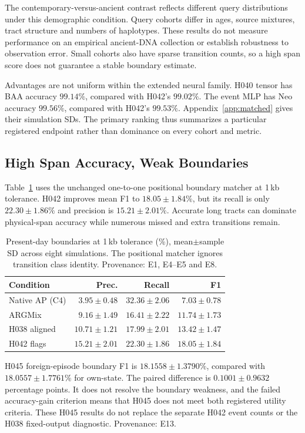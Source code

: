 \documentclass[letterpaper]{article}
\begin{document}
The contemporary-versus-ancient contrast reflects different query distributions under this demographic condition. Query cohorts differ in ages, source mixtures, tract structure and numbers of haplotypes. These results do not measure performance on an empirical ancient-DNA collection or establish robustness to observation error. Small cohorts also have sparse transition counts, so a high span score does not guarantee a stable boundary estimate.

Advantages are not uniform within the extended neural family. H040 tensor has BAA accuracy $99.14\%$, compared with H042's $99.02\%$. The event MLP has Neo accuracy $99.56\%$, compared with H042's $99.53\%$. Appendix~\ref{app:matched} gives their simulation SDs. The primary ranking thus summarizes a particular registered endpoint rather than dominance on every cohort and metric.

\subsection{High Span Accuracy, Weak Boundaries}
Table~\ref{tab:boundaries} uses the unchanged one-to-one positional boundary matcher at 1\,kb tolerance. H042 improves mean F1 to $18.05\pm1.84\%$, but its recall is only $22.30\pm1.86\%$ and precision is $15.21\pm2.01\%$. Accurate long tracts can dominate physical-span accuracy while numerous missed and extra transitions remain.

\begin{table}[t]
\centering
\small
\begin{tabular}{@{}lrrr@{}}
\toprule
Condition & Prec. & Recall & F1 \\
\midrule
Native AP (C4) & $3.95\pm0.48$ & $32.36\pm2.06$ & $7.03\pm0.78$ \\
ARGMix & $9.16\pm1.49$ & $16.41\pm2.22$ & $11.74\pm1.73$ \\
H038 aligned & $10.71\pm1.21$ & $17.99\pm2.01$ & $13.42\pm1.47$ \\
H042 flags & $15.21\pm2.01$ & $22.30\pm1.86$ & $18.05\pm1.84$ \\
\bottomrule
\end{tabular}
\caption{Present-day boundaries at 1\,kb tolerance (\%), mean$\pm$sample SD across eight simulations. The positional matcher ignores transition class identity. Provenance: E1, E4--E5 and E8.}
\label{tab:boundaries}
\end{table}


H045 foreign-episode boundary F1 is $18.1558\pm1.3790\%$, compared with $18.0557\pm1.7761\%$ for own-state. The paired difference is $0.1001\pm0.9632$ percentage points. It does not resolve the boundary weakness, and the failed accuracy-gain criterion means that H045 does not meet both registered utility criteria. These H045 results do not replace the separate H042 event counts or the H038 fixed-output diagnostic. Provenance: E13.
\end{document}

